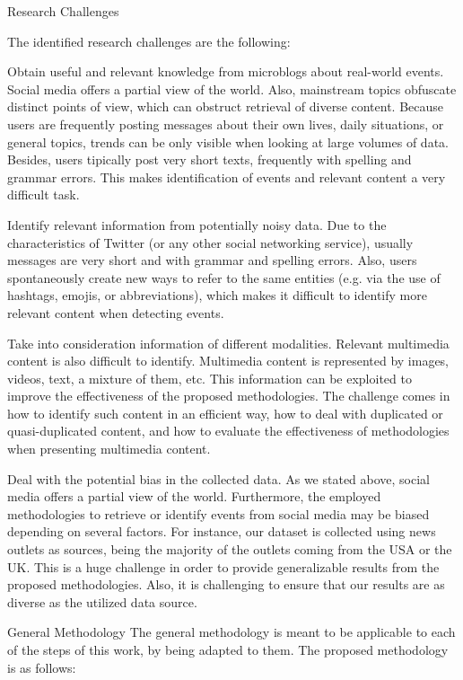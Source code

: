 \begin{intro}
Research Challenges

The identified research challenges are the following: 

Obtain useful and relevant knowledge from microblogs about real-world events.
Social media offers a partial view of the world. Also, mainstream topics
obfuscate distinct points of view, which can obstruct retrieval of diverse
content. Because users are frequently posting messages about their own lives,
daily situations, or general topics, trends can be only visible when looking at
large volumes of data. Besides, users tipically post very short texts,
frequently with spelling and grammar errors. This makes identification of events
and relevant content a very difficult task.


Identify relevant information from potentially noisy data. Due to the
characteristics of Twitter (or any other social networking service), usually
messages are very short and with grammar and spelling errors. Also, users
spontaneously create new ways to refer to the same entities (e.g. via the use of
hashtags, emojis, or abbreviations), which makes it difficult to identify more
relevant content when detecting events.

Take into consideration information of different modalities. Relevant multimedia
content is also difficult to identify. Multimedia content is represented by
images, videos, text, a mixture of them, etc. This information can be exploited
to improve the effectiveness of the proposed methodologies. The challenge comes
in how to identify such content in an efficient way, how to deal with duplicated
or quasi-duplicated content, and how to evaluate the effectiveness of
methodologies when presenting multimedia content. 

Deal with the potential bias in the collected data. As we stated above, social
media offers a partial view of the world. Furthermore, the employed
methodologies to retrieve or identify events from social media may be biased
depending on several factors. For instance, our dataset is collected using news
outlets as sources, being the majority of the outlets coming from the USA or the
UK. This is a huge challenge in order to provide generalizable results from the
proposed methodologies. Also, it is challenging to ensure that our results are
as diverse as the utilized data source. 

General Methodology The general methodology is meant to be applicable to each of
the steps of this work, by being adapted to them. The proposed methodology is as
follows: 


\end{intro}
